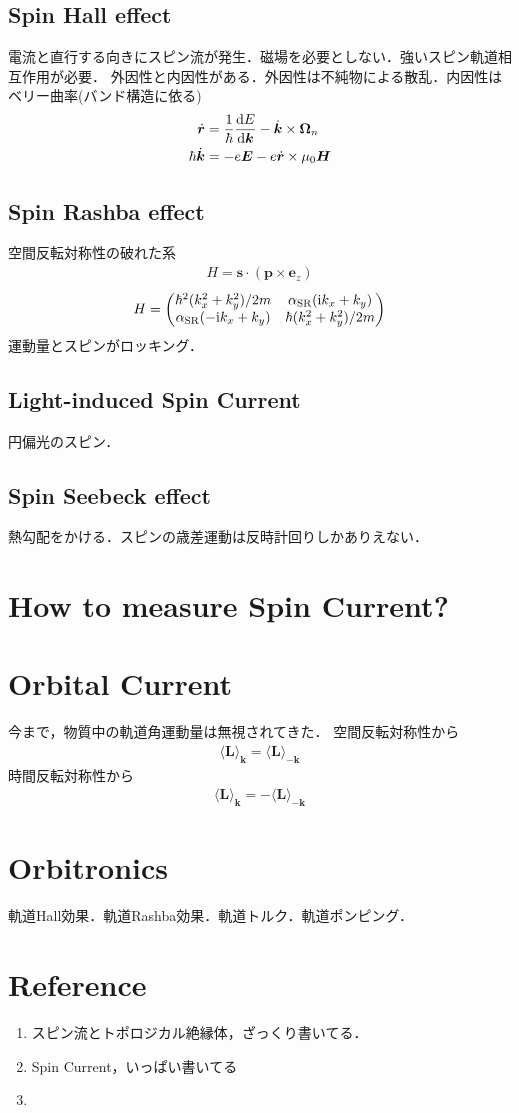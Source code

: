 \documentclass{ltjarticle}
\begin{document}
\subsection{Spin Hall effect}
電流と直行する向きにスピン流が発生．磁場を必要としない．強いスピン軌道相互作用が必要．
外因性と内因性がある．外因性は不純物による散乱．内因性はベリー曲率(バンド構造に依る)
\begin{align}
  \dot{\bm{r}} &= \frac{1}{\hbar}\dv{E}{\bm{k}} - \dot{\bm{k}} \times \bm{\Omega}_n\\
  \hbar\dot{\bm{k}} &= -e\bm{E} - e\dot{\bm{r}}\times \mu_0 \bm{H}
\end{align}
\subsection{Spin Rashba effect}
空間反転対称性の破れた系
\begin{align}
  H = \bm{s}\cdot(\bm{p}\times\bm{e}_z)
\end{align}
\begin{align}
  H = 
  \begin{pmatrix}
    \hbar^2(k_x^2 + k_y^2)/2m & \alpha_{\mathrm{SR}}(\mathrm{i} k_x + k_y)\\
    \alpha_{\mathrm{SR}}(-\mathrm{i} k_x + k_y) & \hbar(k_x^2 + k_y^2)/2m
  \end{pmatrix}
\end{align}
運動量とスピンがロッキング．
\subsection{Light-induced Spin Current}
円偏光のスピン．
\subsection{Spin Seebeck effect}
熱勾配をかける．スピンの歳差運動は反時計回りしかありえない．
\section{How to measure Spin Current?}
\section{Orbital Current}
今まで，物質中の軌道角運動量は無視されてきた．
空間反転対称性から
\begin{align}
  \langle \bm{L} \rangle_{\bm{k}} = \langle \bm{L} \rangle_{-\bm{k}}
\end{align}
時間反転対称性から
\begin{align}
  \langle \bm{L} \rangle_{\bm{k}} = -\langle \bm{L} \rangle_{-\bm{k}}
\end{align}
\section{Orbitronics}
軌道Hall効果．軌道Rashba効果．軌道トルク．軌道ポンピング．
\section*{Reference}
\begin{enumerate}
  \item スピン流とトポロジカル絶縁体，ざっくり書いてる．
  \item Spin Current，いっぱい書いてる
  \item 
\end{enumerate}
\end{document}
